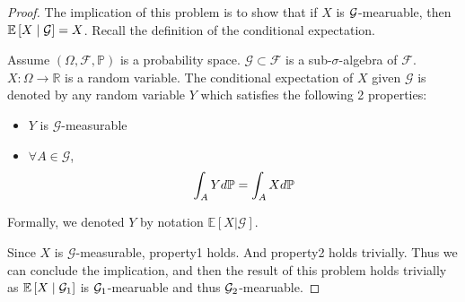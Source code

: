 \begin{proof} 
The implication of this problem is to show that if $X$ is $\mathcal{G}$-mearuable, then $\mathbb{E} \left[X\mid \mathcal{G}\right] = X$. Recall the definition of the conditional expectation. 


\begin{definition}
    Assume $(\Omega,\mathcal{F},\mathbb{P})$ is a probability space. $\mathcal{G}\subset \mathcal{F}$ is a sub-$\sigma$-algebra of $\mathcal{F}$. $X:\Omega\rightarrow \mathbb{R}$ is a random variable. The
conditional expectation of $X$ given $\mathcal{G}$ is denoted by any random variable $Y$ which satisfies the following 2 properties:
\begin{itemize}
    \item $Y$ is $\mathcal{G}$-measurable
    \item $\forall A\in \mathcal{G}$,
        \begin{equation}
            \int_A Yd\mathbb{P}=\int_AXd\mathbb{P}\notag
        \end{equation}
\end{itemize}
Formally, we denoted $Y$ by notation $\mathbb{E}[X|\mathcal{G}]$.
\end{definition}

Since $X$ is $\mathcal{G}$-measurable, property1 holds. And property2 holds trivially. Thus we can conclude the implication, and then the result of this problem holds trivially as $\mathbb{E} \left[X\mid \mathcal{G}_1\right]$ is $\mathcal{G}_1$-mearuable and thus $\mathcal{G}_2$-mearuable. 
\end{proof}






